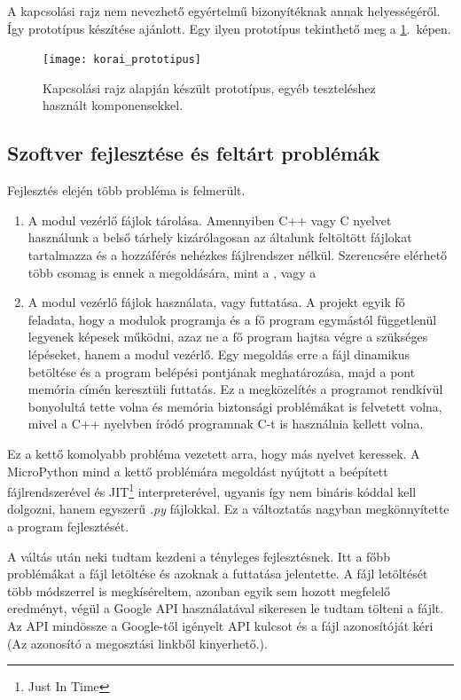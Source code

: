 \documentclass{thesis-ekf}
\theoremstyle{definition}
\theoremstyle{remark}
\begin{document}
	A kapcsolási rajz nem nevezhető egyértelmű bizonyítéknak annak helyességéről. Így prototípus készítése ajánlott. Egy ilyen prototípus tekinthető meg a \ref{img_proto}.~képen.
	\begin{figure}[!ht]
		\centering
		\texttt{[image: korai\_prototipus]}
		\caption{Kapcsolási rajz alapján készült prototípus, egyéb teszteléshez használt komponensekkel.}
		\label{img_proto}
	\end{figure}
	\subsection{Szoftver fejlesztése és feltárt problémák}
	\label{sub_fejlESP}
	Fejlesztés elején több probléma is felmerült.
	\begin{enumerate}
		\item A modul vezérlő fájlok tárolása. Amennyiben C++ vagy C nyelvet használunk a belső tárhely kizárólagosan az általunk feltöltött fájlokat tartalmazza és a hozzáférés nehézkes fájlrendszer nélkül. Szerencsére elérhető több csomag is ennek a megoldására, mint a \href{https://github.com/littlefs-project/littlefs}{\color{blue}{LittleFS}}, vagy a \href{https://docs.espressif.com/projects/esp-idf/en/stable/esp32/api-reference/storage/spiffs.html}{\color{blue}{Spiffs}}
		\item A modul vezérlő fájlok használata, vagy futtatása. A projekt egyik fő feladata, hogy a modulok programja és a fő program egymástól függetlenül legyenek képesek működni, azaz ne a fő program hajtsa végre a szükséges lépéseket, hanem a modul vezérlő. Egy megoldás erre a fájl dinamikus betöltése és a program belépési pontjának meghatározása, majd a pont memória címén keresztüli futtatás. Ez a megközelítés a programot rendkívül bonyolultá tette volna és memória biztonsági problémákat is felvetett volna, mivel a C++ nyelvben íródó programnak C-t is használnia kellett volna.
	\end{enumerate}
	 Ez a kettő komolyabb probléma vezetett arra, hogy más nyelvet keressek. A MicroPython mind a kettő problémára megoldást nyújtott a beépített fájlrendszerével és JIT\footnote{Just In Time} interpreterével, ugyanis így nem bináris kóddal kell dolgozni, hanem egyszerű \textit{.py} fájlokkal.
	 Ez a változtatás nagyban megkönnyítette a program fejlesztését.
	 
	 A váltás után neki tudtam kezdeni a tényleges fejlesztésnek. Itt a főbb problémákat a fájl letöltése és azoknak a futtatása jelentette. A fájl letöltését több módszerrel is megkíséreltem, azonban egyik sem hozott megfelelő eredményt, végül a Google API használatával sikeresen le tudtam tölteni a fájlt. Az API mindössze a Google-től igényelt API kulcsot és a fájl azonosítóját kéri (Az azonosító a megosztási linkből kinyerhető.).
	 
\end{document}
